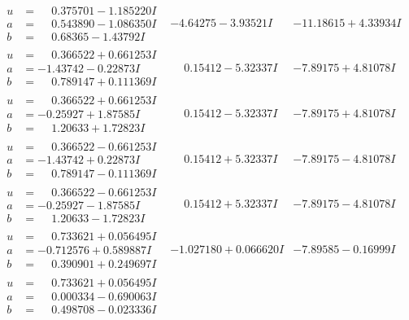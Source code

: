 \documentclass[1p]{elsarticle_modified}
\theoremstyle{definition}
\begin{document}
$$\begin{array}{c|c|c}
\begin{aligned}
u &= \phantom{-}0.375701 - 1.185220 I \\
a &= \phantom{-}0.543890 - 1.086350 I \\
b &= \phantom{-}0.68365 - 1.43792 I\end{aligned}
 & -4.64275 - 3.93521 I & -11.18615 + 4.33934 I \\ \hline\begin{aligned}
u &= \phantom{-}0.366522 + 0.661253 I \\
a &= -1.43742 - 0.22873 I \\
b &= \phantom{-}0.789147 + 0.111369 I\end{aligned}
 & \phantom{-}0.15412 - 5.32337 I & -7.89175 + 4.81078 I \\ \hline\begin{aligned}
u &= \phantom{-}0.366522 + 0.661253 I \\
a &= -0.25927 + 1.87585 I \\
b &= \phantom{-}1.20633 + 1.72823 I\end{aligned}
 & \phantom{-}0.15412 - 5.32337 I & -7.89175 + 4.81078 I \\ \hline\begin{aligned}
u &= \phantom{-}0.366522 - 0.661253 I \\
a &= -1.43742 + 0.22873 I \\
b &= \phantom{-}0.789147 - 0.111369 I\end{aligned}
 & \phantom{-}0.15412 + 5.32337 I & -7.89175 - 4.81078 I \\ \hline\begin{aligned}
u &= \phantom{-}0.366522 - 0.661253 I \\
a &= -0.25927 - 1.87585 I \\
b &= \phantom{-}1.20633 - 1.72823 I\end{aligned}
 & \phantom{-}0.15412 + 5.32337 I & -7.89175 - 4.81078 I \\ \hline\begin{aligned}
u &= \phantom{-}0.733621 + 0.056495 I \\
a &= -0.712576 + 0.589887 I \\
b &= \phantom{-}0.390901 + 0.249697 I\end{aligned}
 & -1.027180 + 0.066620 I & -7.89585 - 0.16999 I \\ \hline\begin{aligned}
u &= \phantom{-}0.733621 + 0.056495 I \\
a &= \phantom{-}0.000334 - 0.690063 I \\
b &= \phantom{-}0.498708 - 0.023336 I\end{aligned}

\end{array}$$
\end{document}
